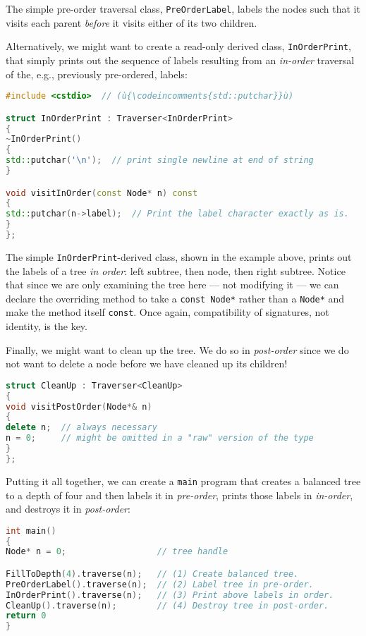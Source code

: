 \noindent The simple pre-order traversal class, \texttt{PreOrderLabel}, labels the
nodes such that it visits each parent \emph{before} it visits either of
its two children.

Alternatively, we might want to create a read-only derived class,
\texttt{InOrderPrint}, that simply prints out the sequence of labels
resulting from an \emph{in-order} traversal of the, e.g., previously
pre-ordered, labels:

\begin{lstlisting}[language=C++]
#include <cstdio>  // (ù{\codeincomments{std::putchar}}ù)

struct InOrderPrint : Traverser<InOrderPrint>
{
~InOrderPrint()
{
std::putchar('\n');  // print single newline at end of string
}

void visitInOrder(const Node* n) const
{
std::putchar(n->label);  // Print the label character exactly as is.
}
};
\end{lstlisting}

\noindent The simple \texttt{InOrderPrint}-derived class, shown in the example above, prints out the
labels of a tree \emph{in order}: left subtree, then node, then right
subtree. Notice that since we are only examining the tree here --- not
modifying it --- we can declare the overriding method to take a
\texttt{const}~\texttt{Node*} rather than a \texttt{Node*} and make the
method itself \texttt{const}. Once again, compatibility of signatures,
not identity, is the key.

Finally, we might want to clean up the tree. We do so in
\emph{post-order} since we do not want to delete a node before we have
cleaned up its children!

\begin{lstlisting}[language=C++]
struct CleanUp : Traverser<CleanUp>
{
void visitPostOrder(Node*& n)
{
delete n;  // always necessary
n = 0;     // might be omitted in a "raw" version of the type
}
};
\end{lstlisting}

\noindent Putting it all together, we can create a \texttt{main} program that
creates a balanced tree to a depth of four and then labels it in
\emph{pre-order}, prints those labels in \emph{in-order}, and destroys
it in \emph{post-order}:

\begin{lstlisting}[language=C++]
int main()
{
Node* n = 0;                  // tree handle

FillToDepth(4).traverse(n);   // (1) Create balanced tree.
PreOrderLabel().traverse(n);  // (2) Label tree in pre-order.
InOrderPrint().traverse(n);   // (3) Print above labels in order.
CleanUp().traverse(n);        // (4) Destroy tree in post-order.
return 0
}
\end{lstlisting}

